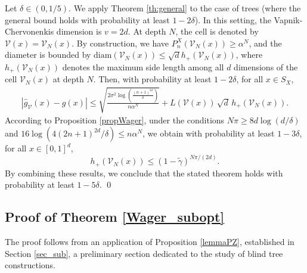 \documentclass[paper=a4, fontsize=11pt]{scrartcl}
\newcommand{\PP}{\mathbb{P}}
\begin{document}
Let $\delta \in (0,1/5)$. We apply Theorem \ref{th:general} to the case of trees (where the general bound holds with probability at least $1-2\delta$). In this setting, the Vapnik-Chervonenkis dimension is $v = 2d$. At depth $N$, the cell is denoted by $\mathcal{V}(x) = \mathcal{V}_N(x)$. By construction, we have $P_n^X(\mathcal{V}_N(x)) \geq \alpha^N$, and the diameter is bounded by $\text{diam}(\mathcal{V}_N(x)) \leq \sqrt{d} h_+(\mathcal{V}_N(x))$, where $h_+(\mathcal{V}_N(x))$ denotes the maximum side length among all $d$ dimensions of the cell $\mathcal{V}_N(x)$ at depth $N$.
Then, with probability at least $1 - 2 \delta $, for all $x\in S_X$,
        \begin{align*}
       |  \hat g_{\mathcal V}(x) - g(x)| \leq \sqrt{\frac{ 2 \sigma^2 \log\left( \frac{ (n+1) ^{2d} }{\delta} \right)}{ n \alpha^N  } } + L(\mathcal V(x)  ) \, \sqrt{d} \, h_+(\mathcal{V}_N(x)).
    \end{align*}
According to Proposition \ref{propWager}, under the conditions $N \pi \geq 8d \log(d/\delta)$ and $16 \log ( 4 (2n+1)^{2d} / \delta) \leq n \alpha^{N}$, we obtain with probability at least $1-3\delta$, for all $x\in [0,1]^d$, 
$$h_{+}(\mathcal{V}_N(x))\le (1 - \tilde{\gamma})^{N \pi/(2d)}.$$ 
By combining these results, we conclude that the stated theorem holds with probability at least $1 - 5\delta$. \qed




\subsection*{Proof of Theorem \ref{Wager_subopt}}
The proof follows from an application of Proposition \ref{lemmaPZ}, established in Section \ref{sec_sub}, a preliminary section dedicated to the study of blind tree constructions. 
\end{document}
